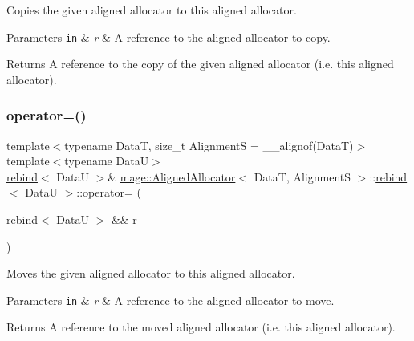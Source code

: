 Copies the given aligned allocator to this aligned allocator.


\begin{DoxyParams}[1]{Parameters}
\mbox{\tt in}  & {\em r} & A reference to the aligned allocator to copy. \\
\hline
\end{DoxyParams}
\begin{DoxyReturn}{Returns}
A reference to the copy of the given aligned allocator (i.\+e. this aligned allocator). 
\end{DoxyReturn}
\hypertarget{structmage_1_1_aligned_allocator_1_1rebind_a4345d236bd6d9abfc475ec575dc8dde2}{}\label{structmage_1_1_aligned_allocator_1_1rebind_a4345d236bd6d9abfc475ec575dc8dde2} 
\subsubsection{\texorpdfstring{operator=()}{operator=()}\hspace{0.1cm}{\footnotesize\ttfamily [2/2]}}
{\footnotesize\ttfamily template$<$typename DataT, size\+\_\+t AlignmentS = \+\_\+\+\_\+alignof(\+Data\+T)$>$ \\
template$<$typename DataU$>$ \\
\hyperlink{structmage_1_1_aligned_allocator_1_1rebind}{rebind}$<$ DataU $>$\& \hyperlink{structmage_1_1_aligned_allocator}{mage\+::\+Aligned\+Allocator}$<$ DataT, AlignmentS $>$\+::\hyperlink{structmage_1_1_aligned_allocator_1_1rebind}{rebind}$<$ DataU $>$\+::operator= (\begin{DoxyParamCaption}\item[{\hyperlink{structmage_1_1_aligned_allocator_1_1rebind}{rebind}$<$ DataU $>$ \&\&}]{r }\end{DoxyParamCaption})\hspace{0.3cm}{\ttfamily [delete]}}

Moves the given aligned allocator to this aligned allocator.


\begin{DoxyParams}[1]{Parameters}
\mbox{\tt in}  & {\em r} & A reference to the aligned allocator to move. \\
\hline
\end{DoxyParams}
\begin{DoxyReturn}{Returns}
A reference to the moved aligned allocator (i.\+e. this aligned allocator). 
\end{DoxyReturn}
